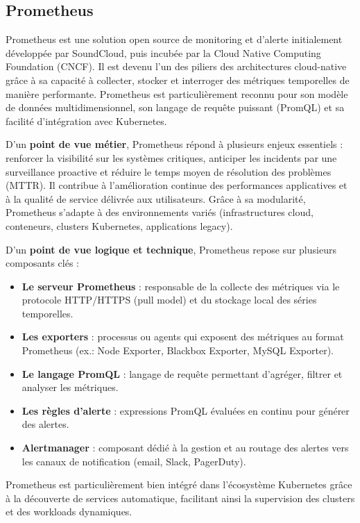 \subsection{Prometheus}

Prometheus est une solution open source de monitoring et d’alerte initialement développée par SoundCloud, puis incubée par la Cloud Native Computing Foundation (CNCF). Il est devenu l’un des piliers des architectures cloud-native grâce à sa capacité à collecter, stocker et interroger des métriques temporelles de manière performante. Prometheus est particulièrement reconnu pour son modèle de données multidimensionnel, son langage de requête puissant (PromQL) et sa facilité d’intégration avec Kubernetes.

D’un \textbf{point de vue métier}, Prometheus répond à plusieurs enjeux essentiels  : renforcer la visibilité sur les systèmes critiques, anticiper les incidents par une surveillance proactive et réduire le temps moyen de résolution des problèmes (MTTR). Il contribue à l’amélioration continue des performances applicatives et à la qualité de service délivrée aux utilisateurs. Grâce à sa modularité, Prometheus s’adapte à des environnements variés (infrastructures cloud, conteneurs, clusters Kubernetes, applications legacy).

D’un \textbf{point de vue logique et technique}, Prometheus repose sur plusieurs composants clés  :
\begin{itemize}
	\item \textbf{Le serveur Prometheus}  : responsable de la collecte des métriques via le protocole HTTP/HTTPS (pull model) et du stockage local des séries temporelles.
	\item \textbf{Les exporters}  : processus ou agents qui exposent des métriques au format Prometheus (ex.: Node Exporter, Blackbox Exporter, MySQL Exporter).
	\item \textbf{Le langage PromQL}  : langage de requête permettant d’agréger, filtrer et analyser les métriques.
	\item \textbf{Les règles d’alerte}  : expressions PromQL évaluées en continu pour générer des alertes.
	\item \textbf{Alertmanager}  : composant dédié à la gestion et au routage des alertes vers les canaux de notification (email, Slack, PagerDuty).
\end{itemize}

Prometheus est particulièrement bien intégré dans l’écosystème Kubernetes grâce à la découverte de services automatique, facilitant ainsi la supervision des clusters et des workloads dynamiques.

